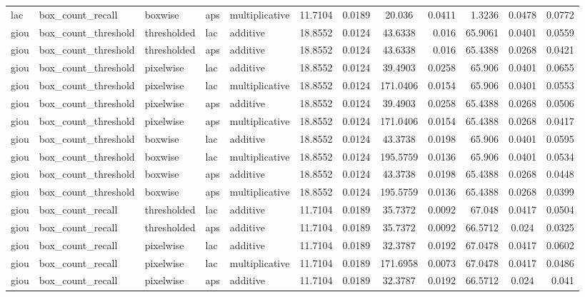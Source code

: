 \begin{table*}[htbp]
\begin{tabular}{@{}lllll rrcrrcr@{}}
lac & box\_count\_recall & boxwise & aps & multiplicative & 11.7104 & 0.0189 & 20.036 & 0.0411 & 1.3236 & 0.0478 & 0.0772 \\
giou & box\_count\_threshold & thresholded & lac & additive & 18.8552 & 0.0124 & 43.6338 & 0.016 & 65.9061 & 0.0401 & 0.0559 \\
giou & box\_count\_threshold & thresholded & aps & additive & 18.8552 & 0.0124 & 43.6338 & 0.016 & 65.4388 & 0.0268 & 0.0421 \\
giou & box\_count\_threshold & pixelwise & lac & additive & 18.8552 & 0.0124 & 39.4903 & 0.0258 & 65.906 & 0.0401 & 0.0655 \\
giou & box\_count\_threshold & pixelwise & lac & multiplicative & 18.8552 & 0.0124 & 171.0406 & 0.0154 & 65.906 & 0.0401 & 0.0553 \\
giou & box\_count\_threshold & pixelwise & aps & additive & 18.8552 & 0.0124 & 39.4903 & 0.0258 & 65.4388 & 0.0268 & 0.0506 \\
giou & box\_count\_threshold & pixelwise & aps & multiplicative & 18.8552 & 0.0124 & 171.0406 & 0.0154 & 65.4388 & 0.0268 & 0.0417 \\
giou & box\_count\_threshold & boxwise & lac & additive & 18.8552 & 0.0124 & 43.3738 & 0.0198 & 65.906 & 0.0401 & 0.0595 \\
giou & box\_count\_threshold & boxwise & lac & multiplicative & 18.8552 & 0.0124 & 195.5759 & 0.0136 & 65.906 & 0.0401 & 0.0534 \\
giou & box\_count\_threshold & boxwise & aps & additive & 18.8552 & 0.0124 & 43.3738 & 0.0198 & 65.4388 & 0.0268 & 0.0448 \\
giou & box\_count\_threshold & boxwise & aps & multiplicative & 18.8552 & 0.0124 & 195.5759 & 0.0136 & 65.4388 & 0.0268 & 0.0399 \\
giou & box\_count\_recall & thresholded & lac & additive & 11.7104 & 0.0189 & 35.7372 & 0.0092 & 67.048 & 0.0417 & 0.0504 \\
giou & box\_count\_recall & thresholded & aps & additive & 11.7104 & 0.0189 & 35.7372 & 0.0092 & 66.5712 & 0.024 & 0.0325 \\
giou & box\_count\_recall & pixelwise & lac & additive & 11.7104 & 0.0189 & 32.3787 & 0.0192 & 67.0478 & 0.0417 & 0.0602 \\
giou & box\_count\_recall & pixelwise & lac & multiplicative & 11.7104 & 0.0189 & 171.6958 & 0.0073 & 67.0478 & 0.0417 & 0.0486 \\
giou & box\_count\_recall & pixelwise & aps & additive & 11.7104 & 0.0189 & 32.3787 & 0.0192 & 66.5712 & 0.024 & 0.041 \\

\end{tabular}
\end{table*}
